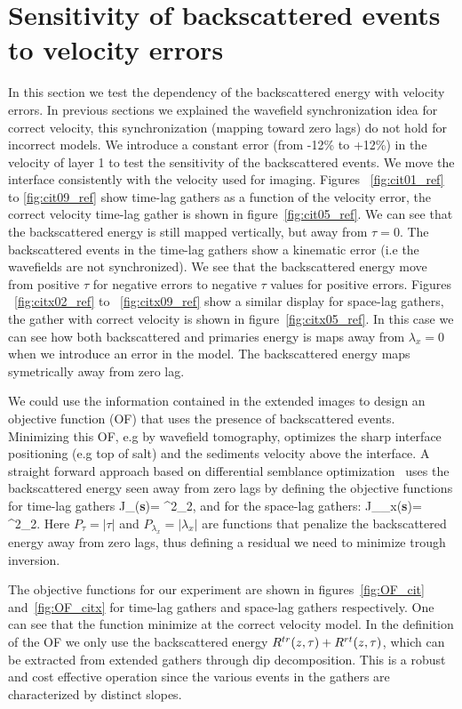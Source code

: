 \section{Sensitivity of backscattered events to velocity errors}
In this section we test the dependency of the backscattered energy with velocity errors. In previous sections we explained the wavefield 
synchronization idea for correct velocity, this synchronization (mapping toward zero lags) do not hold for incorrect models. 
We introduce a constant error (from -12\% to +12\%) in the velocity of layer 1 to test the sensitivity of the backscattered events.
We move the interface consistently with the velocity used for imaging.
Figures ~\ref{fig:cit01_ref} to \ref{fig:cit09_ref} show time-lag gathers as a function of the velocity error, 
the correct velocity time-lag gather is shown in figure~\ref{fig:cit05_ref}. We can see that the backscattered energy is still mapped vertically, but
away from $\tau=0$. The backscattered events in the time-lag gathers show a kinematic error (i.e the wavefields are not synchronized). We 
see that the backscattered energy move from positive $\tau$ for negative errors to negative $\tau$ values for positive errors. 
%
Figures ~\ref{fig:citx02_ref} to ~\ref{fig:citx09_ref} show a similar display for space-lag gathers, the gather with correct velocity is shown
in figure~\ref{fig:citx05_ref}. 
In this case we can see how both backscattered and primaries energy is maps away from $\lambda_x=0$ when we introduce an error in the model. The backscattered energy maps symetrically
away from zero lag.  

We could use the information contained in the extended images to design an objective function (OF) that uses the presence of backscattered events. 
Minimizing this OF, e.g by wavefield tomography, optimizes the sharp interface positioning (e.g top of salt) and the sediments velocity above the interface.
A straight forward approach based on differential semblance optimization~\citep{shen:2132} uses
 the backscattered energy seen away from zero lags by defining the objective functions for time-lag gathers
\beq
 J_{\tau}({\bf s})=  ^2_2,
\label{eq:of1}
\eeq 
and for the space-lag gathers:
\beq
 J_{\lambda_x}({\bf s})=  ^2_2.
\label{eq:of2}
\eeq 
%
Here $P_{\tau}=|\tau|$ and $P_{\lambda_x}=|\lambda_x|$ are functions that penalize the backscattered energy away 
from zero lags, thus defining a residual we need to minimize trough inversion.

The objective functions for our experiment are shown in figures~\ref{fig:OF_cit} and~\ref{fig:OF_citx} for time-lag gathers
and space-lag gathers respectively. One can see that the function minimize at the correct velocity model. In the definition 
of the OF we only use the backscattered energy $R^{tr}(z,\tau)+R^{rt}(z,\tau)$, which can be extracted from extended gathers through dip
decomposition. This is a robust and cost effective operation since the various events in the gathers are characterized
by distinct slopes.
